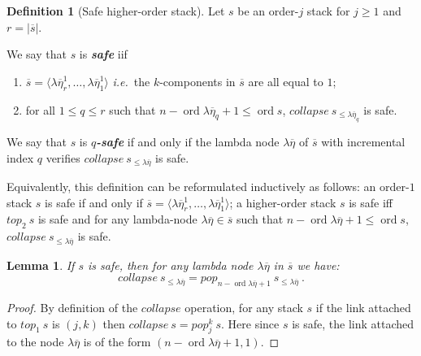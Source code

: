 \documentclass{article}
\newcommand{\ord}{\mathop{\mathrm{ord}}}
\newcommand{\prefixof}{\leqslant}
\newcommand\defname[1]{{\bf\em #1}\index{#1}}
\newtheorem{lemma}{Lemma}[section]
\theoremstyle{remark}
\theoremstyle{definition}
\newtheorem{definition}{Definition}[section]
\newcommand\orddec\overline
\def\ie{{\it i.e.}\ }
\begin{document}
\begin{definition}[Safe higher-order stack]
\label{dfn:safestack} Let $s$ be an order-$j$ stack for $j\geq1$ and $r
= |\orddec{s}|$.

We say that $s$ is \defname{safe} iif
    \begin{enumerate}[1.]
    \item $\orddec{s} = \langle \lambda \overline\eta_r^1, \ldots ,
    \lambda \overline{\eta}_1^1 \rangle$ \ie the $k$-components in $\orddec{s}$ are all equal to $1$;
    \item for all $1 \leq q \leq r$ such that $n-\ord{\lambda \overline\eta_q}+1 \leq \ord{s}$,
    $collapse~s_{\prefixof \lambda\overline\eta_q}$ is safe.
    \end{enumerate}
        
We say that $s$ is \defname{$q$-safe} if and only if the lambda node 
$\lambda\overline\eta$ of $\orddec{s}$ with incremental index $q$ verifies
    $collapse~s_{\prefixof \lambda\overline\eta}$ is safe.
\end{definition}

Equivalently, this definition can be reformulated inductively as follows:
an order-$1$ stack $s$ is safe if and only if $\orddec{s} = \langle \lambda \overline{\eta}_r^1, \ldots , \lambda \overline{\eta}_1^1 \rangle$;
a higher-order stack $s$ is safe iff $top_2~s$ is safe and
for any lambda-node $\lambda\overline\eta \in \orddec{s}$ such that $n-\ord{\lambda \overline{\eta}}+1 \leq \ord{s}$,
    $collapse~s_{\prefixof\lambda\overline\eta}$ is safe.


\begin{lemma}
\label{lem:safecollapsesimulation} 
If $s$ is safe, then for any lambda node $\lambda\overline\eta$ in $\orddec{s}$ we have:
$$collapse~s_{\prefixof\lambda\overline\eta} = pop_{n-\ord{\lambda\overline\eta}+1} ~s_{\prefixof\lambda\overline\eta} \ . $$
\end{lemma}

\begin{proof}
By definition of the $collapse$ operation, for any stack $s$ if the link attached to $top_1~s$ is $(j,k)$ then $collapse~s = pop_j^k~s$. Here since $s$ is safe, the link attached to the node $\lambda\overline\eta$ is of the form
$(n-\ord{\lambda\overline\eta}+1,1)$.
\end{proof}
\end{document}
